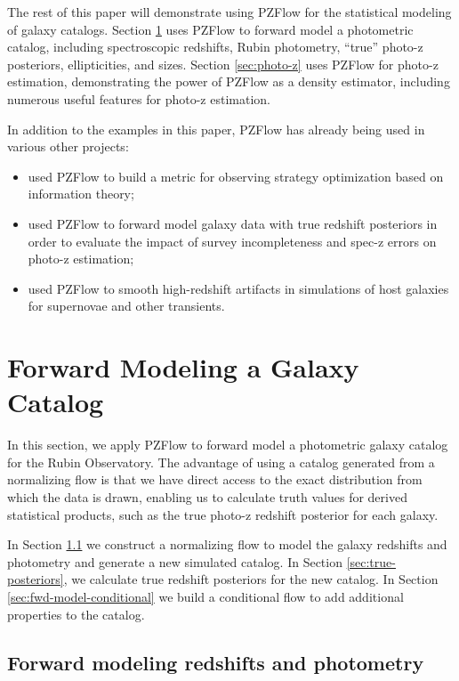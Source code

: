 \documentclass[twocolumn]{aastex631}
\begin{document}
The rest of this paper will demonstrate using PZFlow for the statistical modeling of galaxy catalogs.
Section \ref{sec:galaxy-catalog} uses PZFlow to forward model a photometric catalog, including spectroscopic redshifts, Rubin photometry, ``true'' photo-z posteriors, ellipticities, and sizes.
Section \ref{sec:photo-z} uses PZFlow for photo-z estimation, demonstrating the power of PZFlow as a density estimator, including numerous useful features for photo-z estimation.

In addition to the examples in this paper, PZFlow has already being used in various other projects:
\begin{itemize}
    \item \citet{malz2021} used PZFlow to build a metric for observing strategy optimization based on information theory;
    \item \citet{stylianou2022} used PZFlow to forward model galaxy data with true redshift posteriors in order to evaluate the impact of survey incompleteness and spec-z errors on photo-z estimation;
    \item \citet{lokken2022} used PZFlow to smooth high-redshift artifacts in simulations of host galaxies for supernovae and other transients.
\end{itemize}


\section{Forward Modeling a Galaxy Catalog}
\label{sec:galaxy-catalog}

In this section, we apply PZFlow to forward model a photometric galaxy catalog for the Rubin Observatory.
The advantage of using a catalog generated from a normalizing flow is that we have direct access to the exact distribution from which the data is drawn, enabling us to calculate truth values for derived statistical products, such as the true photo-z redshift posterior for each galaxy.

In Section \ref{sec:fwd-model} we construct a normalizing flow to model the galaxy redshifts and photometry and generate a new simulated catalog.
In Section \ref{sec:true-posteriors}, we calculate true redshift posteriors for the new catalog.
In Section \ref{sec:fwd-model-conditional} we build a conditional flow to add additional properties to the catalog.

\subsection{Forward modeling redshifts and photometry}
\label{sec:fwd-model}
\end{document}
